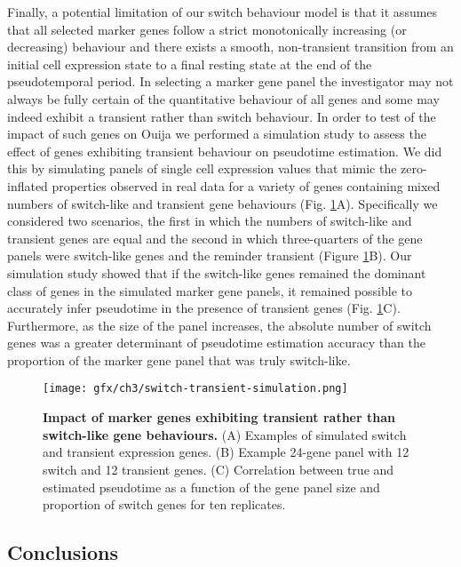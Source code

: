 Finally, a potential limitation of our switch behaviour model is that it assumes that all selected marker genes follow a strict monotonically increasing (or decreasing) behaviour and there exists a smooth, non-transient transition from an initial cell expression state to a final resting state at the end of the pseudotemporal period. In selecting a marker gene panel the investigator may not always be fully certain of the quantitative behaviour of all genes and some may indeed exhibit a transient rather than switch behaviour. In order to test of the impact of such genes on Ouija we performed a simulation study to assess the effect of genes exhibiting transient behaviour on pseudotime estimation. We did this by simulating panels of single cell expression values that mimic the zero-inflated properties observed in real data for a variety of genes containing mixed numbers of switch-like and transient gene behaviours (Fig. \ref{fig:switch-transient-simulation}A). Specifically we considered two scenarios, the first in which the numbers of switch-like and transient genes are equal and the second in which three-quarters of the gene panels were switch-like genes and the reminder transient (Figure \ref{fig:switch-transient-simulation}B). Our simulation study showed that if the switch-like genes remained the dominant class of genes in the simulated marker gene panels, it remained possible to accurately infer pseudotime in the presence of transient genes (Fig. \ref{fig:switch-transient-simulation}C). Furthermore, as the size of the panel increases, the absolute number of switch genes was a greater determinant of pseudotime estimation accuracy than the proportion of the marker gene panel that was truly switch-like.

\begin{figure}[!t]
	\texttt{[image: gfx/ch3/switch-transient-simulation.png]}
	\caption{{\bf Impact of marker genes exhibiting transient rather than switch-like gene behaviours.} (A) Examples of simulated switch and transient expression genes. (B) Example 24-gene panel with 12 switch and 12 transient genes. (C) Correlation between true and estimated pseudotime as a function of the gene panel size and proportion of switch genes for ten replicates.}
	\label{fig:switch-transient-simulation}
\end{figure}

\subsection{Conclusions}

